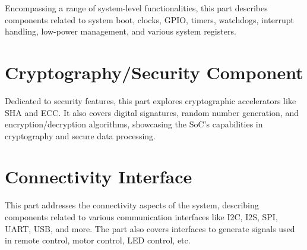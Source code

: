 \documentclass[openany, 10pt]{book}
\begin{document}

Encompassing a range of system-level functionalities, this part describes components related to system boot, clocks, GPIO, timers, watchdogs, interrupt handling, low-power management, and various system registers.


\part{Cryptography/Security Component}

Dedicated to security features, this part explores cryptographic accelerators like SHA and ECC. It also covers digital signatures, random number generation, and encryption/decryption algorithms, showcasing the SoC's capabilities in cryptography and secure data processing.




\part{Connectivity Interface}


This part addresses the connectivity aspects of the system, describing components related to various communication interfaces like I2C, I2S, SPI, UART, USB, and more. The part also covers interfaces to generate signals used in remote control, motor control, LED control, etc.

\end{document}
